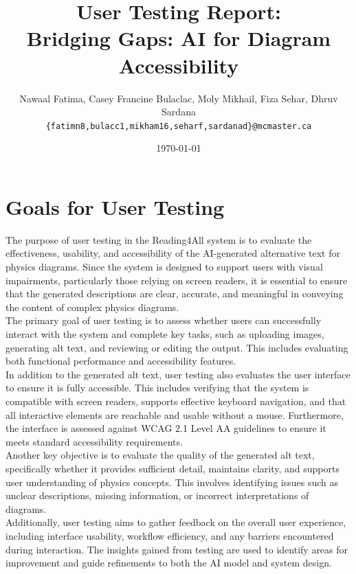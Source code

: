 \documentclass{article}
\title{User Testing Report:\\Bridging Gaps: AI for Diagram Accessibility}
\author{Nawaal Fatima, Casey Francine Bulaclac, Moly Mikhail, Fiza Sehar, Dhruv Sardana \\
  \texttt{\{fatimn8,bulacc1,mikham16,seharf,sardanad\}@mcmaster.ca} }
\date{\today}
\begin{document}
\maketitle

\section{Goals for User Testing}

The purpose of user testing in the Reading4All system is to evaluate the effectiveness, usability, 
and accessibility of the AI-generated alternative text for physics diagrams. Since the system is 
designed to support users with visual impairments, particularly those relying on screen readers, 
it is essential to ensure that the generated descriptions are clear, accurate, and meaningful in 
conveying the content of complex physics diagrams. \\

The primary goal of user testing is to assess whether users can successfully interact with the 
system and complete key tasks, such as uploading images, generating alt text, and reviewing or 
editing the output. This includes evaluating both functional performance and accessibility features. \\

In addition to the generated alt text, user testing also evaluates the user interface to ensure it 
is fully accessible. This includes verifying that the system is compatible with screen readers, 
supports effective keyboard navigation, and that all interactive elements are reachable and 
usable without a mouse. Furthermore, the interface is assessed against WCAG 2.1 Level AA guidelines 
to ensure it meets standard accessibility requirements. \\

Another key objective is to evaluate the quality of the generated alt text, specifically whether it 
provides sufficient detail, maintains clarity, and supports user understanding of physics concepts. 
This involves identifying issues such as unclear descriptions, missing information, or incorrect 
interpretations of diagrams. \\

Additionally, user testing aims to gather feedback on the overall user experience, including 
interface usability, workflow efficiency, and any barriers encountered during interaction. The insights 
gained from testing are used to identify areas for improvement and guide refinements to both the AI model 
and system design. \\
\end{document}
